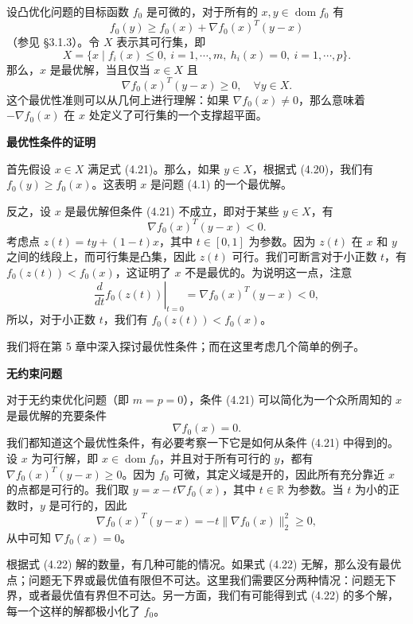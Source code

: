 \documentclass[UTF8, 12pt, fontset=fandol, oneside]{ctexart}
\begin{document}
设凸优化问题的目标函数 $f_0$ 是可微的，对于所有的 $x,y\in\operatorname{dom} f_0$ 有
\begin{equation}
f_0(y)\geq f_0(x)+\nabla f_0(x)^T(y-x)
\tag{4.20}
\end{equation}
（参见 §3.1.3）。令 $X$ 表示其可行集，即
\[
X=\{x\mid f_i(x)\leq 0,\ i=1,\cdots,m,\ h_i(x)=0,\ i=1,\cdots,p\}.
\]
那么，$x$ 是最优解，当且仅当 $x\in X$ 且
\begin{equation}
\nabla f_0(x)^T(y-x)\geq 0,\quad \forall y\in X.
\tag{4.21}
\end{equation}
这个最优性准则可以从几何上进行理解：如果 $\nabla f_0(x)\neq 0$，那么意味着 $-\nabla f_0(x)$ 在 $x$ 处定义了可行集的一个支撑超平面。

\noindent\textbf{最优性条件的证明}

首先假设 $x\in X$ 满足式 (4.21)。那么，如果 $y\in X$，根据式 (4.20)，我们有 $f_0(y)\geq f_0(x)$。这表明 $x$ 是问题 (4.1) 的一个最优解。

反之，设 $x$ 是最优解但条件 (4.21) 不成立，即对于某些 $y\in X$，有
\[
\nabla f_0(x)^T(y-x)<0.
\]
考虑点 $z(t)=ty+(1-t)x$，其中 $t\in[0,1]$ 为参数。因为 $z(t)$ 在 $x$ 和 $y$ 之间的线段上，而可行集是凸集，因此 $z(t)$ 可行。我们可断言对于小正数 $t$，有 $f_0(z(t))<f_0(x)$，这证明了 $x$ 不是最优的。为说明这一点，注意
\[
\left.\frac{d}{dt}f_0(z(t))\right|_{t=0}
=\nabla f_0(x)^T(y-x)<0,
\]
所以，对于小正数 $t$，我们有 $f_0(z(t))<f_0(x)$。

我们将在第 5 章中深入探讨最优性条件；而在这里考虑几个简单的例子。

\noindent\textbf{无约束问题}

对于无约束优化问题（即 $m=p=0$），条件 (4.21) 可以简化为一个众所周知的 $x$ 是最优解的充要条件
\begin{equation}
\nabla f_0(x)=0.
\tag{4.22}
\end{equation}
我们都知道这个最优性条件，有必要考察一下它是如何从条件 (4.21) 中得到的。设 $x$ 为可行解，即 $x\in\operatorname{dom} f_0$，并且对于所有可行的 $y$，都有 $\nabla f_0(x)^T(y-x)\geq 0$。因为 $f_0$ 可微，其定义域是开的，因此所有充分靠近 $x$ 的点都是可行的。我们取 $y=x-t\nabla f_0(x)$，其中 $t\in\mathbb{R}$ 为参数。当 $t$ 为小的正数时，$y$ 是可行的，因此
\[
\nabla f_0(x)^T(y-x)=-t\|\nabla f_0(x)\|_2^2\geq 0,
\]
从中可知 $\nabla f_0(x)=0$。

根据式 (4.22) 解的数量，有几种可能的情况。如果式 (4.22) 无解，那么没有最优点；问题无下界或最优值有限但不可达。这里我们需要区分两种情况：问题无下界，或者最优值有界但不可达。另一方面，我们有可能得到式 (4.22) 的多个解，每一个这样的解都极小化了 $f_0$。
\end{document}
